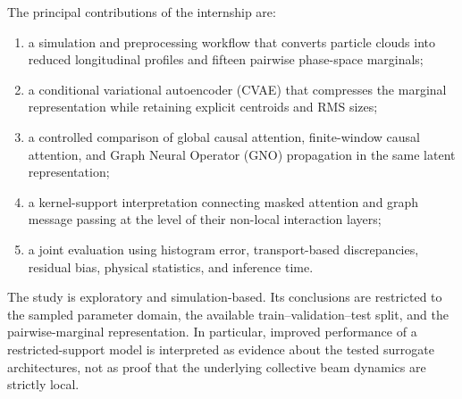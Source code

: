 The principal contributions of the internship are:
\begin{enumerate}
    \item a simulation and preprocessing workflow that converts particle clouds into reduced longitudinal profiles and fifteen pairwise phase-space marginals;
    \item a conditional variational autoencoder (CVAE) that compresses the marginal representation while retaining explicit centroids and RMS sizes;
    \item a controlled comparison of global causal attention, finite-window causal attention, and Graph Neural Operator (GNO) propagation in the same latent representation;
    \item a kernel-support interpretation connecting masked attention and graph message passing at the level of their non-local interaction layers;
    \item a joint evaluation using histogram error, transport-based discrepancies, residual bias, physical statistics, and inference time.
\end{enumerate}

The study is exploratory and simulation-based. Its conclusions are restricted to the sampled parameter domain, the available train--validation--test split, and the pairwise-marginal representation. In particular, improved performance of a restricted-support model is interpreted as evidence about the tested surrogate architectures, not as proof that the underlying collective beam dynamics are strictly local.

